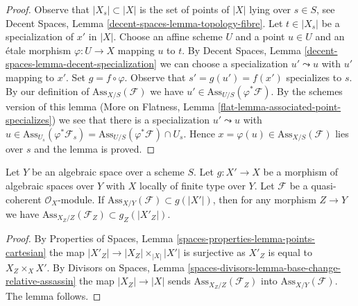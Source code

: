 \begin{proof}
Observe that $|X_s| \subset |X|$ is the set of points of $|X|$
lying over $s \in S$, see
Decent Spaces, Lemma \ref{decent-spaces-lemma-topology-fibre}.
Let $t \in |X_s|$ be a specialization of $x'$ in $|X|$.
Choose an affine scheme $U$ and a point $u \in U$ and
an \'etale morphism $\varphi : U \to X$ mapping $u$ to $t$.
By Decent Spaces, Lemma \ref{decent-spaces-lemma-decent-specialization}
we can choose a specialization $u' \leadsto u$
with $u'$ mapping to $x'$. Set $g = f \circ \varphi$.
Observe that $s' = g(u') = f(x')$ specializes to $s$.
By our definition of $\text{Ass}_{X/S}(\mathcal{F})$
we have $u' \in \text{Ass}_{U/S}(\varphi^*\mathcal{F})$.
By the schemes version of this lemma
(More on Flatness, Lemma \ref{flat-lemma-associated-point-specializes})
we see that there is a specialization $u' \leadsto u$ with
$u \in \text{Ass}_{U_s}(\varphi^*\mathcal{F}_s) =
\text{Ass}_{U/S}(\varphi^*\mathcal{F}) \cap U_s$.
Hence $x = \varphi(u) \in \text{Ass}_{X/S}(\mathcal{F})$
lies over $s$ and the lemma is proved.
\end{proof}

\begin{lemma}
\label{lemma-contains-relative-ass-after-base-change}
Let $Y$ be an algebraic space over a scheme $S$. Let $g : X' \to X$ be a
morphism of algebraic spaces over $Y$ with $X$ locally of finite type over $Y$.
Let $\mathcal{F}$ be a quasi-coherent $\mathcal{O}_X$-module.
If $\text{Ass}_{X/Y}(\mathcal{F}) \subset g(|X'|)$, then for any morphism
$Z \to Y$ we have $\text{Ass}_{X_Z/Z}(\mathcal{F}_Z) \subset g_Z(|X'_Z|)$.
\end{lemma}

\begin{proof}
By Properties of Spaces, Lemma \ref{spaces-properties-lemma-points-cartesian}
the map $|X'_Z| \to |X_Z| \times_{|X|} |X'|$ is surjective as
$X'_Z$ is equal to $X_Z \times_X X'$.
By Divisors on Spaces, Lemma
\ref{spaces-divisors-lemma-base-change-relative-assassin}
the map $|X_Z| \to |X|$ sends $\text{Ass}_{X_Z/Z}(\mathcal{F}_Z)$
into $\text{Ass}_{X/Y}(\mathcal{F})$. The lemma follows.
\end{proof}

